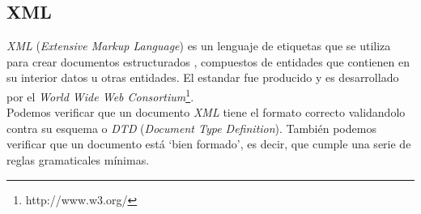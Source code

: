 \subsection{XML}
\emph{XML} (\emph{Extensive Markup Language}) es un lenguaje de etiquetas que se utiliza para crear documentos estructurados \cite{website:xml}, compuestos de entidades que contienen en su interior datos u otras entidades.
El estandar fue producido y es desarrollado por el \emph{World Wide Web Consortium}\footnote{http://www.w3.org/}.
\\
Podemos verificar que un documento \emph{XML} tiene el formato correcto validandolo contra su esquema o \emph{DTD} (\emph{Document Type Definition}).
También podemos verificar que un documento está `bien formado', es decir, que cumple una serie de reglas gramaticales mínimas.